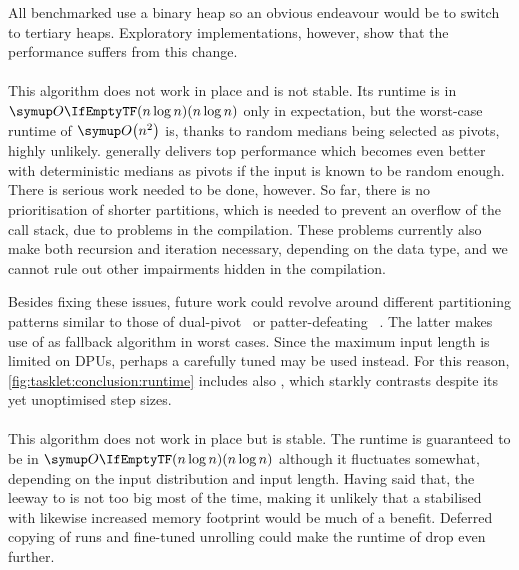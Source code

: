 All benchmarked \HS*{} use a binary heap so an obvious endeavour would be to switch to tertiary heaps.
Exploratory implementations, however, show that the performance suffers from this change.


\paragraph{\QS{}}
This algorithm does not work in place and is not stable.
Its runtime is in \(\bigoh{n \log n}\) only in expectation, but the worst-case runtime of \(\bigoh*{n^2}\) is, thanks to random medians being selected as pivots, highly unlikely.
\QS{} generally delivers top performance which becomes even better with deterministic medians as pivots if the input is known to be random enough.
There is serious work needed to be done, however.
So far, there is no prioritisation of shorter partitions, which is needed to prevent an overflow of the call stack, due to problems in the compilation.
These problems currently also make both recursion and iteration necessary, depending on the data type, and we cannot rule out other impairments hidden in the compilation.

Besides fixing these issues, future work could revolve around different partitioning patterns similar to those of dual-pivot~\cite{wild2012averagecase} or patter-defeating \QS{}~\cite{peters2021patterndefeatingquicksort}.
The latter makes use of \HS{} as fallback algorithm in worst cases.
Since the maximum input length is limited on \acp{DPU}, perhaps a carefully tuned \ShS{} may be used instead.
For this reason, \cref{fig:tasklet:conclusion:runtime} includes also \ShS{}, which starkly contrasts \HS{} despite its yet unoptimised step sizes.


\paragraph{\MS{}}
This algorithm does not work in place but is stable.
The runtime is guaranteed to be in \(\bigoh{n \log n}\) although it fluctuates somewhat, depending on the input distribution and input length.
Having said that, the leeway to \QS{} is not too big most of the time, making it unlikely that a stabilised \QS{} with likewise increased memory footprint would be much of a benefit.
Deferred copying of runs and fine-tuned unrolling could make the runtime of \MS{} drop even further.

